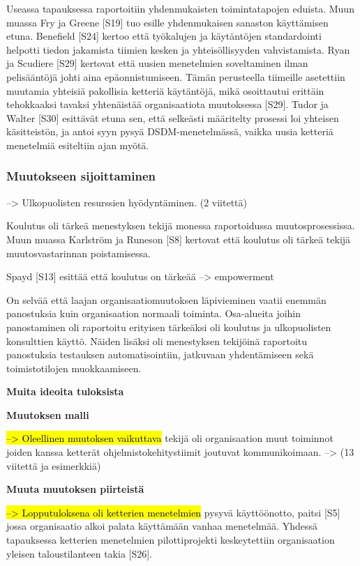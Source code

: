 Useassa tapauksessa raportoitiin yhdenmukaisten toimintatapojen eduista.
Muun muassa Fry ja Greene [S19] tuo esille yhdenmukaisen sanaston käyttämisen
etuna. Benefield [S24] kertoo että työkalujen ja käytäntöjen standardointi
helpotti tiedon jakamista tiimien kesken ja yhteisöllisyyden vahvistamista. Ryan
ja Scudiere [S29] kertovat että uusien menetelmien soveltaminen ilman
pelisääntöjä johti aina epäonnistumiseen. Tämän perusteella tiimeille asetettiin
muutamia yhteisiä pakollisia ketteriä käytäntöjä, mikä osoittautui erittäin
tehokkaaksi tavaksi yhtenäistää organisaatiota muutoksessa [S29]. Tudor ja
Walter [S30] esittävät etuna sen, että selkeästi määritelty prosessi loi
yhteisen käsitteistön, ja antoi syyn pysyä DSDM-menetelmässä, vaikka uusia
ketteriä menetelmiä esiteltiin ajan myötä.


\subsubsection{Muutokseen sijoittaminen}

--> Ulkopuolisten resurssien hyödyntäminen. (2 viitettä)

Koulutus oli tärkeä menestyksen tekijä monessa raportoidussa muutosprosessissa.
Muun muassa Karlström ja Runeson [S8] kertovat että koulutus oli tärkeä tekijä
muutosvastarinnan poistamisessa.

Spayd [S13] esittää että koulutus on tärkeää --> empowerment

On selvää että laajan organisaatiomuutoksen läpivieminen vaatii enemmän
panostuksia kuin organisaation normaali toiminta. Osa-alueita joihin
panostaminen oli raportoitu erityisen tärkeäksi oli koulutus ja ulkopuolisten
konsulttien käyttö. Näiden lisäksi oli menestyksen tekijöinä raportoitu
panostuksia testauksen automatisointiin, jatkuvaan yhdentämiseen sekä
toimistotilojen muokkaamiseen.

\vspace{1cm}
\large
\textbf{Muita ideoita tuloksista}
\normalsize

\textbf{Muutoksen malli}

\hl{--> Oleellinen muutoksen vaikuttava} tekijä oli organisaation muut toiminnot
joiden kanssa ketterät ohjelmistokehitystiimit joutuvat kommunikoimaan.
--> (13 viitettä ja esimerkkiä)

\textbf{Muuta muutoksen piirteistä}

\hl{--> Lopputuloksena oli ketterien menetelmien} pysyvä käyttöönotto, paitsi [S5]
jossa organisaatio alkoi palata käyttämään vanhaa menetelmää. Yhdessä
tapauksessa ketterien menetelmien pilottiprojekti keskeytettiin
organisaation yleisen taloustilanteen takia [S26].

